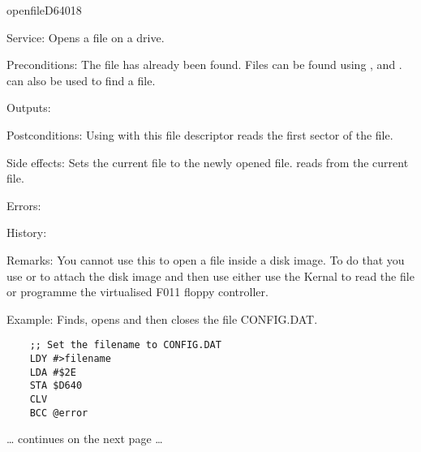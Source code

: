 \newpage
\begin{hyppotrap}{openfile}{D640}{18}
\item [Service:]
  Opens a file on a drive.
\item [Preconditions:]
  The file has already been found. Files can be found using ,
   and .  can also be
  used to find a file.
\item [Outputs:]
\item [Postconditions:]
  Using  with this file descriptor reads the first sector of
  the file.
\item [Side effects:]
  Sets the current file to the newly opened file.  reads
  from the current file.
\item [Errors:]
\item [History:]
\item [Remarks:]
  You cannot use this to open a file inside a disk image. To do that you use
   or  to attach the disk image and
  then use either use the Kernal to read the file or programme the virtualised
  F011 floppy controller.
\item [Example:]
  Finds, opens and then closes the file CONFIG.DAT.

\begin{tcolorbox}[colback=black,coltext=white]
\verbatimfont{\codefont}
\begin{verbatim}
    ;; Set the filename to CONFIG.DAT
    LDY #>filename
    LDA #$2E
    STA $D640
    CLV
    BCC @error
\end{verbatim}
\end{tcolorbox}

\ldots{} continues on the next page \ldots


\end{hyppotrap}
